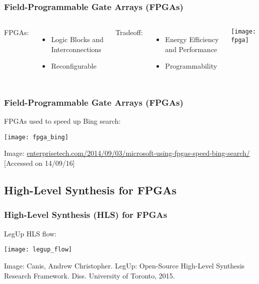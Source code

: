 \documentclass[10pt, compress, aspectratio=169]{beamer}
\begin{document}
\begin{frame}
    \frametitle{Field-Programmable Gate Arrays (FPGAs)}
    \begin{columns}[c,onlytextwidth]
        FPGAs:
        \begin{itemize}
            \item \alert{Logic Blocks} and \alert{Interconnections}
            \item \alert{Reconfigurable}
        \end{itemize}

        Tradeoff:
        \begin{itemize}
            \item \alert{Energy Efficiency} and \alert{Performance}
            \item \alert{Programmability}
        \end{itemize}

        \begin{center}
            \texttt{[image: fpga]}
        \end{center}
    \end{columns}
\end{frame}

\begin{frame}
    \frametitle{Field-Programmable Gate Arrays (FPGAs)}
    FPGAs used to speed up Bing search:
    \begin{center}
        \texttt{[image: fpga\_bing]}

        \tiny{Image: \url{enterprisetech.com/2014/09/03/microsoft-using-fpgas-speed-bing-search/} [Accessed on 14/09/16]}
    \end{center}
\end{frame}

\subsection{High-Level Synthesis for FPGAs}

\begin{frame}
    \frametitle{High-Level Synthesis (HLS) for FPGAs}
    \alert{LegUp} HLS flow:

    \begin{center}
        \texttt{[image: legup\_flow]}

        \tiny{Image: Canis, Andrew Christopher. LegUp: Open-Source High-Level Synthesis Research Framework. Diss. University of Toronto, 2015.}
    \end{center}
\end{frame}
\end{document}
